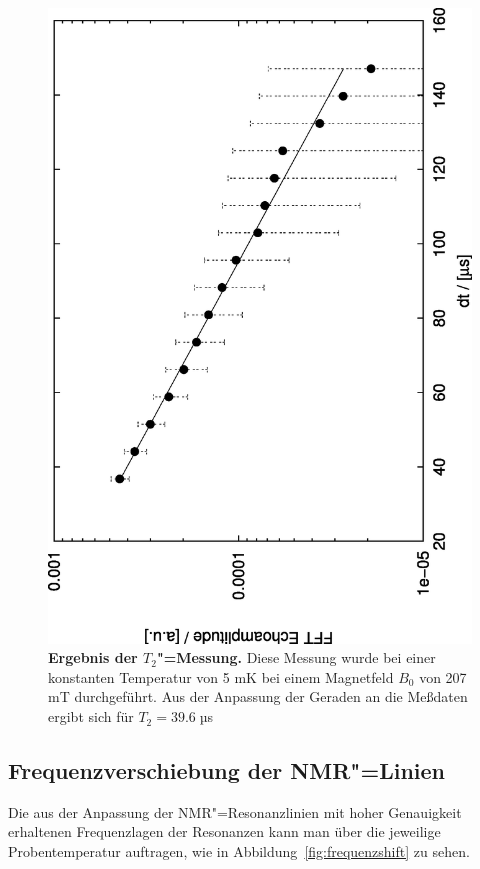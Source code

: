 \begin{figure}[htp]
	\begin{center}
		\includegraphics[angle=-90,width=\midwidth]{plots/t2_aug0897_4}
	\end{center}
	\caption[Ergebnis der $T_2$"=Messung]{{\upshape\bfseries Ergebnis der $T_2$"=Messung.} Diese Messung wurde bei einer
		konstanten Temperatur von 5 mK bei einem Magnetfeld $B_0$ von 207 mT durchgeführt. Aus
		der Anpassung der Geraden an die Meßdaten ergibt sich für $T_2=39.6\;µ$s}
	\label{fig:t2ergebnis}
 \end{figure}

\subsection{Frequenzverschiebung der NMR"=Linien}
Die aus der Anpassung der NMR"=Resonanzlinien mit hoher Genauigkeit erhaltenen Frequenzlagen der
Resonanzen kann man über die jeweilige Probentemperatur auftragen, wie in Abbildung~\ref{fig:frequenzshift}
zu sehen.

